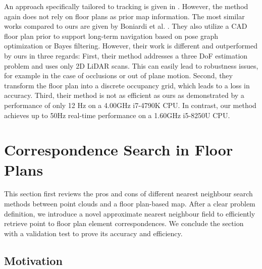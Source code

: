\documentclass[letterpaper, 10 pt, conference]{ieeeconf}  %
\begin{document}
An approach specifically tailored to tracking is given in \cite{el2005road}. However, the method again does not rely on floor plans as prior map information. The most similar works compared to ours are given by Boniardi et al. \cite{boniardi2017robust, boniardi2019pose}. They also utilize a CAD floor plan prior to support long-term navigation based on pose graph optimization or Bayes filtering. However, their work is different and outperformed by ours in three regards: First, their method addresses a three DoF estimation problem and uses only 2D LiDAR scans. This can easily lead to robustness issues, for example in the case of occlusions or out of plane motion. Second, they transform the floor plan into a discrete occupancy grid, which leads to a loss in accuracy. Third, their method is not as efficient as ours as demonstrated by a performance of only 12 Hz on a 4.00GHz i7-4790K CPU. In contrast, our method achieves up to 50Hz real-time performance on a 1.60GHz i5-8250U CPU.


\section{Correspondence Search in Floor Plans}
\label{sec:ANNF}

This section first reviews the pros and cons of different nearest neighbour search methods between point clouds and a floor plan-based map. After a clear problem definition, we introduce a novel approximate nearest neighbour field to efficiently retrieve point to floor plan element correspondences. We conclude the section with a validation test to prove its accuracy and efficiency. 

\subsection{Motivation}
\end{document}
